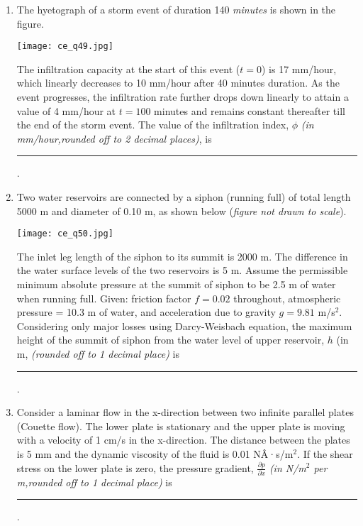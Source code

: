 \documentclass[12pt]{article}
\begin{document}
\begin{enumerate}[label= Q.\arabic*,start =26]
	\item The hyetograph of a storm event of duration 140 \emph{minutes} is shown in the figure.

		\begin{center}{

				\texttt{[image: ce\_q49.jpg]}

		}\end{center}

		The infiltration capacity at the start of this event ($t = 0$) is 17 mm/hour, which linearly decreases to 10 mm/hour after 40 minutes duration. As the event progresses, the infiltration rate further drops down linearly to attain a value of 4 mm/hour at $t = 100$ minutes and remains constant thereafter till the end of the storm event. The value of the infiltration index, $\phi$ \textit{(in mm/hour,rounded off to 2 decimal places)}, is \rule{3cm}{0.15mm}.

	\item Two water reservoirs are connected by a siphon (running full) of total length 5000 m and diameter of 0.10 m, as shown below (\emph{figure not drawn to scale}).

		\begin{center}
			{
				\texttt{[image: ce\_q50.jpg]}
		}\end{center}

		The inlet leg length of the siphon to its summit is 2000 m. The difference in the water surface levels of the two reservoirs is 5 m. Assume the permissible minimum absolute pressure at the summit of siphon to be 2.5 m of water when running full. Given: friction factor $f = 0.02$ throughout, atmospheric pressure = 10.3 m of water, and acceleration due to gravity $g = 9.81$ m/s$^2$. Considering only major losses using Darcy-Weisbach equation, the maximum height of the summit of siphon from the water level of upper reservoir, $h$ (in m, \textit{(rounded off to 1 decimal place)} is \rule{3cm}{0.15mm}.
	\item Consider a laminar flow in the x-direction between two infinite parallel plates (Couette flow). The lower plate is stationary and the upper plate is moving with a velocity of 1 cm/s in the x-direction. The distance between the plates is 5 mm and the dynamic viscosity of the fluid is 0.01 NÂ·s/m$^2$. If the shear stress on the lower plate is zero, the pressure gradient, $\frac{\partial p}{\partial x}$ \textit{(in N/m$^2$ per m,rounded off to 1 decimal place)} is \rule{3cm}{0.15mm}.


\end{enumerate}
\end{document}
